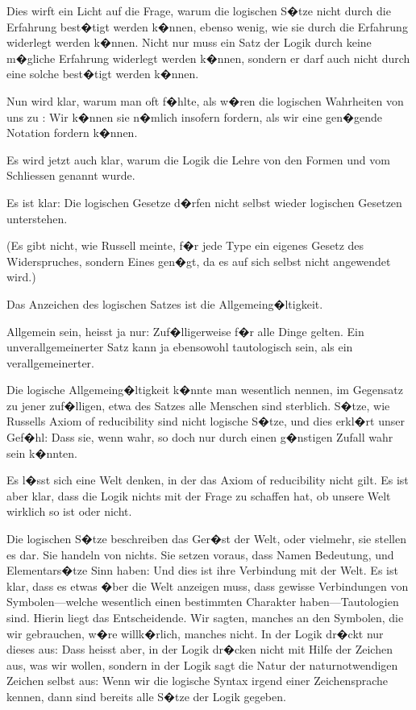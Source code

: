 \begin{propositions}
{Dies wirft ein Licht auf die Frage, warum die
logischen S�tze nicht durch die Erfahrung best�tigt
werden k�nnen, ebenso wenig, wie sie durch die
Erfahrung widerlegt werden k�nnen. Nicht nur
muss ein Satz der Logik durch keine m�gliche Erfahrung
widerlegt werden k�nnen, sondern er darf auch
nicht durch eine solche best�tigt werden k�nnen.}


{Nun wird klar, warum man oft f�hlte, als w�ren
die \glqq{}logischen Wahrheiten\grqq{} von uns zu \glqq{}\grqq{}:
Wir k�nnen sie n�mlich insofern fordern, als wir
eine gen�gende Notation fordern k�nnen.}


{Es wird jetzt auch klar, warum die Logik die
Lehre von den Formen und vom Schliessen genannt
wurde.}


{Es ist klar: Die logischen Gesetze d�rfen nicht
selbst wieder logischen Gesetzen unterstehen.

(Es gibt nicht, wie Russell meinte, f�r jede
\glqq{}Type\grqq{} ein eigenes Gesetz des Widerspruches,
sondern Eines gen�gt, da es auf sich selbst nicht
angewendet wird.)}


{Das Anzeichen des logischen Satzes ist 
die Allgemeing�ltigkeit.

Allgemein sein, heisst ja nur: Zuf�lligerweise
f�r alle Dinge gelten. Ein unverallgemeinerter
Satz kann ja ebensowohl tautologisch sein, als ein
verallgemeinerter.}


{Die logische Allgemeing�ltigkeit k�nnte man
wesentlich nennen, im Gegensatz zu jener zuf�lligen,
etwa des Satzes \glqq{}alle Menschen sind sterblich\grqq{}.
S�tze, wie Russells \glqq{}Axiom of reducibility\grqq{} sind
nicht logische S�tze, und dies erkl�rt unser Gef�hl:
Dass sie, wenn wahr, so doch nur durch einen
g�nstigen Zufall wahr sein k�nnten.}


{Es l�sst sich eine Welt denken, in der das
Axiom of reducibility nicht gilt. Es ist aber klar,
dass die Logik nichts mit der Frage zu schaffen
hat, ob unsere Welt wirklich so ist oder nicht.}


{Die logischen S�tze beschreiben das Ger�st der
Welt, oder vielmehr, sie stellen es dar. Sie
\glqq{}handeln\grqq{} von nichts. Sie setzen voraus, dass
Namen Bedeutung, und Elementars�tze Sinn
haben: Und dies ist ihre Verbindung mit der
Welt. Es ist klar, dass es etwas �ber die Welt
anzeigen muss, dass gewisse Verbindungen von
Symbolen---welche wesentlich einen bestimmten
Charakter haben---Tautologien sind. Hierin liegt
das Entscheidende. Wir sagten, manches an
den Symbolen, die wir gebrauchen, w�re willk�rlich,
manches nicht. In der Logik dr�ckt nur
dieses aus: Dass heisst aber, in der Logik dr�cken
nicht  mit Hilfe der Zeichen aus, was wir
wollen, sondern in der Logik sagt die Natur der
naturnotwendigen Zeichen selbst aus: Wenn wir die
logische Syntax irgend einer Zeichensprache kennen,
dann sind bereits alle S�tze der Logik gegeben.}



\end{propositions}
